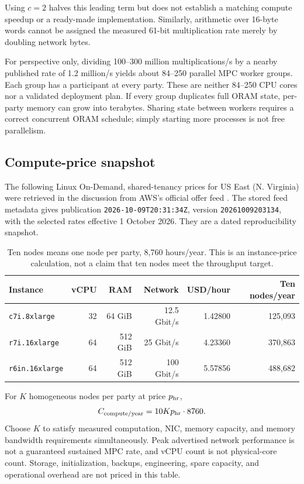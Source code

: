 \documentclass[11pt]{article}
\begin{document}
Using $c=2$ halves this leading term but does not establish a matching compute
speedup or a ready-made implementation. Similarly, arithmetic over 16-byte words
cannot be assigned the measured 61-bit multiplication rate merely by doubling
network bytes.

For perspective only, dividing 100--300 million multiplications/s by a nearby
published rate of 1.2 million/s yields about 84--250 parallel MPC worker groups.
Each group has a participant at every party. These are neither 84--250 CPU cores
nor a validated deployment plan. If every group duplicates full ORAM state,
per-party memory can grow into terabytes. Sharing state between workers requires
a correct concurrent ORAM schedule; simply starting more processes is not free
parallelism.

\subsection{Compute-price snapshot}

The following Linux On-Demand, shared-tenancy prices for US East (N. Virginia)
were retrieved in the discussion from AWS's official offer feed
\cite{awsprices}. The stored feed metadata gives publication
\texttt{2026-10-09T20:31:34Z}, version \texttt{20261009203134}, with the selected
rates effective 1 October 2026. They are a dated reproducibility snapshot.

\begin{table}[htbp]
\centering
\small
\begin{tabular}{@{}lrrrrr@{}}
\toprule
Instance & vCPU & RAM & Network & USD/hour & Ten nodes/year \\
\midrule
\texttt{c7i.8xlarge} & 32 & 64 GiB & 12.5 Gbit/s & 1.42800 & 125,093 \\
\texttt{r7i.16xlarge} & 64 & 512 GiB & 25 Gbit/s & 4.23360 & 370,863 \\
\texttt{r6in.16xlarge} & 64 & 512 GiB & 100 Gbit/s & 5.57856 & 488,682 \\
\bottomrule
\end{tabular}
\caption{Ten nodes means one node per party, 8,760 hours/year. This is an
instance-price calculation, not a claim that ten nodes meet the throughput target.}
\end{table}

For $K$ homogeneous nodes per party at price $p_{\rm hr}$,
\begin{equation}
C_{\rm compute/year}=10Kp_{\rm hr}\cdot8760.
\label{eq:compute-cost}
\end{equation}
Choose $K$ to satisfy measured computation, NIC, memory capacity, and memory
bandwidth requirements simultaneously. Peak advertised network performance is
not a guaranteed sustained MPC rate, and vCPU count is not physical-core count.
Storage, initialization, backups, engineering, spare capacity, and operational
overhead are not priced in this table.
\end{document}
